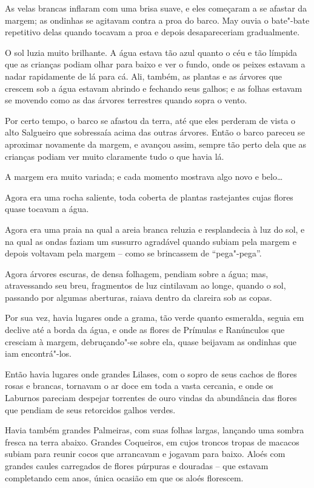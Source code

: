 As velas brancas inflaram com uma brisa suave, e eles começaram a se
afastar da margem; as ondinhas se agitavam contra a proa do barco. May
ouvia o bate"-bate repetitivo delas quando tocavam a proa e depois desapareceriam gradualmente.

O sol luzia muito brilhante. A água estava tão azul quanto o céu e tão
límpida que as crianças podiam olhar para baixo e ver o fundo, onde os
peixes estavam a nadar rapidamente de lá para cá. Ali, também, as
plantas e as árvores que crescem sob a água estavam abrindo e fechando
seus galhos; e as folhas estavam se movendo como as das árvores
terrestres quando sopra o vento.

Por certo tempo, o barco se afastou da terra, até que eles perderam de
vista o alto Salgueiro que sobressaía acima das outras árvores. Então o
barco pareceu se aproximar novamente da margem, e avançou assim, sempre
tão perto dela que as crianças podiam ver muito claramente tudo o que
havia lá.

A margem era muito variada; e cada momento mostrava algo novo e
belo\ldots{}

Agora era uma rocha saliente, toda coberta de plantas rastejantes cujas
flores quase tocavam a água.

Agora era uma praia na qual a areia branca reluzia e resplandecia à luz
do sol, e na qual as ondas faziam um sussurro agradável quando subiam
pela margem e depois voltavam pela margem -- como se
brincassem de ``pega"-pega''.

Agora árvores escuras, de densa folhagem, pendiam sobre a água; mas,
atravessando seu breu, fragmentos de luz cintilavam ao longe, quando o
sol, passando por algumas aberturas, raiava dentro da clareira sob as
copas.

Por sua vez, havia lugares onde a grama, tão verde quanto esmeralda,
seguia em declive até a borda da água, e onde as flores de Prímulas e
Ranúnculos que cresciam à margem, debruçando"-se sobre ela, quase
beijavam as ondinhas que iam encontrá"-los.

Então havia lugares onde grandes Lilases, com o sopro de seus cachos de
flores rosas e brancas, tornavam o ar doce em toda a vasta cercania, e
onde os Laburnos pareciam despejar torrentes de ouro vindas da
abundância das flores que pendiam de seus retorcidos galhos verdes.

Havia também grandes Palmeiras, com suas folhas largas, lançando uma
sombra fresca na terra abaixo. Grandes Coqueiros, em cujos troncos
tropas de macacos subiam para reunir cocos que arrancavam
e jogavam para baixo. Aloés com grandes caules carregados de flores
púrpuras e douradas -- que estavam completando cem anos, única ocasião
em que os aloés florescem.

